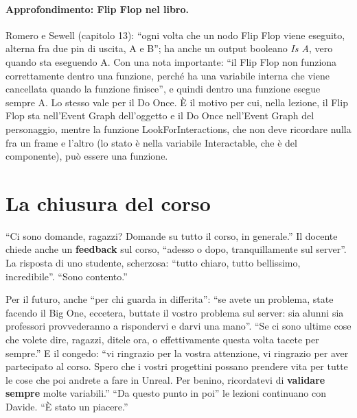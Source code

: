 \paragraph{Approfondimento: Flip Flop nel libro.} Romero e Sewell (capitolo 13): ``ogni volta
che un nodo Flip Flop viene eseguito, alterna fra due pin di uscita, A e B''; ha anche un
output booleano \emph{Is A}, vero quando sta eseguendo A. Con una nota importante: ``il Flip
Flop non funziona correttamente dentro una funzione, perché ha una variabile interna che
viene cancellata quando la funzione finisce'', e quindi dentro una funzione esegue sempre A.
Lo stesso vale per il Do Once. È il motivo per cui, nella lezione, il Flip Flop sta
nell'Event Graph dell'oggetto e il Do Once nell'Event Graph del personaggio, mentre la
funzione LookForInteractions, che non deve ricordare nulla fra un frame e l'altro (lo stato
è nella variabile Interactable, che è del componente), può essere una funzione.

\section{La chiusura del corso}
\label{ue12:sec:chiusura}

``Ci sono domande, ragazzi? Domande su tutto il corso, in generale.'' Il docente chiede
anche un \textbf{feedback} sul corso, ``adesso o dopo, tranquillamente sul server''. La
risposta di uno studente, scherzosa: ``tutto chiaro, tutto bellissimo, incredibile''. ``Sono
contento.''

Per il futuro, anche ``per chi guarda in differita'': ``se avete un problema, state facendo il
Big One, eccetera, buttate il vostro problema sul server: sia alunni sia professori
provvederanno a rispondervi e darvi una mano''. ``Se ci sono ultime cose che volete dire,
ragazzi, ditele ora, o effettivamente questa volta tacete per sempre.'' E il congedo: ``vi
ringrazio per la vostra attenzione, vi ringrazio per aver partecipato al corso. Spero che i
vostri progettini possano prendere vita per tutte le cose che poi andrete a fare in Unreal.
Per benino, ricordatevi di \textbf{validare sempre} molte variabili.'' ``Da questo punto in
poi'' le lezioni continuano con Davide. ``È stato un piacere.''

